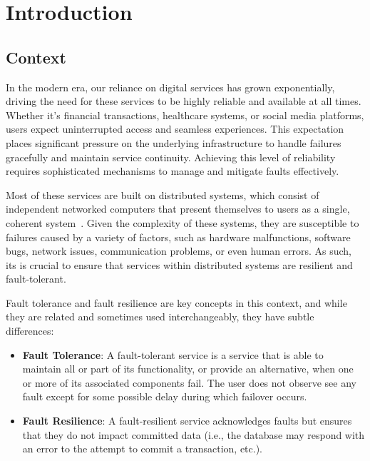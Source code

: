\chapter{Introduction}\label{ch:introduction}


\section{Context}\label{sec:context}

In the modern era, our reliance on digital services has grown exponentially, driving the need for these services to be highly reliable and available at all times. Whether it's financial transactions, healthcare systems, or social media platforms, users expect uninterrupted access and seamless experiences. This expectation places significant pressure on the underlying infrastructure to handle failures gracefully and maintain service continuity. Achieving this level of reliability requires sophisticated mechanisms to manage and mitigate faults effectively.

Most of these services are built on distributed systems,
which consist of independent networked computers that present themselves to users as a single,
coherent system~\cite{fcc-distributed-systems}. Given the complexity of these systems, they are susceptible to failures caused by a variety of factors, such as hardware malfunctions, software bugs, network issues, communication problems, or even human errors. As such, its is crucial to ensure that services within distributed systems are resilient and fault-tolerant.

Fault tolerance and fault resilience are key concepts in this context, and while they are related and sometimes used interchangeably, they have subtle differences:

\begin{itemize}
    \item {\textbf{Fault Tolerance}}:
    A fault-tolerant service is a service that is able to maintain all or part of its functionality,
    or provide an alternative, when one or more of its associated components fail.
    The user does not observe see any fault except for some possible delay during which failover occurs.
    \item {\textbf{Fault Resilience}}: A fault-resilient service acknowledges faults but ensures that they do not impact committed data (i.e., the database may respond with an error to the attempt to commit a transaction, etc.).
\end{itemize}

